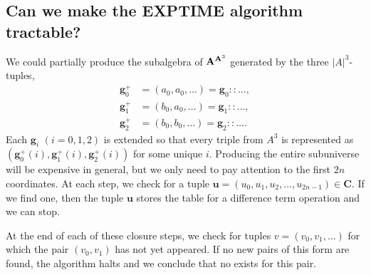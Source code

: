     \subsection{Can we make the {\small EXPTIME} algorithm tractable?}
    We could partially produce the subalgebra of $\mathbf{A}^{\mathbf{A}^3}$ generated by
    the three $|A|^3$-tuples,
    \begin{align*}
    \mathbf{g}^+_0 &= (a_0, a_0, \dots) = \mathbf{g}_0 :: \dots,\\
    \mathbf{g}^+_1 &= (b_0, a_0, \dots) = \mathbf{g}_1 :: \dots,\\
    \mathbf{g}^+_2 &= (b_0, b_0, \dots) = \mathbf{g}_2 :: \dots.
    \end{align*}
    Each $\mathbf{g}_i$ $(i=0,1,2)$ is extended so that every 
    triple from $A^3$ is represented as $(\mathbf{g}^+_0(i), \mathbf{g}^+_1(i), \mathbf{g}^+_2(i))$ for some 
    unique $i$.  Producing the entire subuniverse will be expensive in 
    general, but we only need to pay attention to the first $2n$ coordinates. 
    At each step, we check for a tuple $\mathbf{u} = (u_0, u_1, u_2, \dots, u_{2n-1})\in \mathbf{C}$.  
    If we find one, then the tuple $\mathbf{u}$ stores
    the table for a difference term operation and we can stop.
    
    At the end of each of these closure steps, we check for 
    tuples $v = (v_0, v_1, \dots)$ for which the pair $(v_0, v_1)$ has not
    yet appeared.  If no new pairs of this form are found, the algorithm halts
    and we conclude that no \ldto exists for this pair.
    
  





  
  
  
  
  
  
  
  

  












